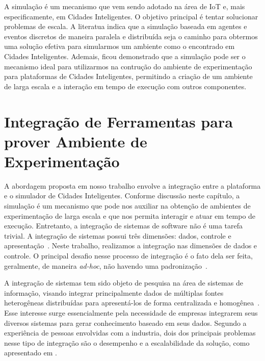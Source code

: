 A simulação é um mecanismo que vem sendo adotado na área de IoT e, mais especificamente, em Cidades Inteligentes.
O objetivo principal é tentar solucionar problemas de escala.
A literatua indica que a simulação baseada em agentes e eventos discretos de maneira paralela e distribuída seja o caminho para obtermos uma solução efetiva para simularmos um ambiente como o encontrado em
Cidades Inteligentes.
Ademais, ficou demonstrado que a simulação pode ser o mecanismo ideal para utilizarmos na contrução do ambiente de experimentação para plataformas de Cidades Inteligentes, permitindo a criação
de um ambiente de larga escala e a interação em tempo de execução com outros componentes.

\section{Integração de Ferramentas para prover Ambiente de Experimentação}


A abordagem proposta em nosso trabalho envolve a integração entre a plataforma e o simulador de Cidades Inteligentes.
Conforme discussão neste capítulo, a simulação é um mecanismo que pode nos auxiliar na obtenção de ambientes de experimentação de larga escala e que nos permita interagir e atuar em tempo de execução.
Entretanto, a integração de sistemas de software não é uma tarefa trivial.
A integração de sistemas possui três dimensões: dados, controle e apresentação~\citep{wasserman_1990}.
Neste trabalho, realizamos a integração nas dimensões de dados e controle.
O principal desafio nesse processo de integração é o fato dela ser feita, geralmente, de maneira \textit{ad-hoc}, não havendo uma padronização~\citep{wasserman_1990}.

A integração de sistemas tem sido objeto de pesquisa na área de sistemas de informação, visando integrar principalmente dados de múltiplas fontes heterogêneas distribuídas para apresentá-los de forma
centralizada e homogênea~\citep{genesereth_1997}.
Esse interesse surge essencialmente pela necessidade de empresas integrarem seus diversos sistemas para gerar conhecimento baseado em seus dados.
Segundo a experiência de pessoas envolvidas com a industria, dois dos principais problemas nesse tipo de integração são o desempenho e a escalabilidade da solução, como apresentado em \cite{halevy_2005}.

